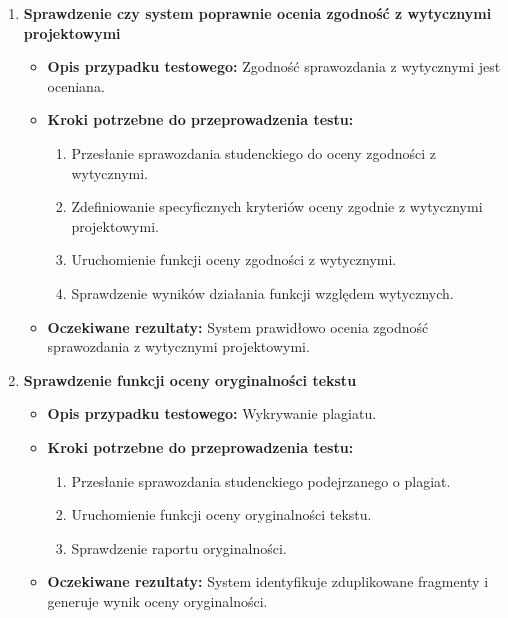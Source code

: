 \documentclass[a4paper, 12pt]{article}
\begin{document}
\begin{enumerate}
\item \textbf{Sprawdzenie czy system poprawnie ocenia zgodność z wytycznymi projektowymi}
   \begin{itemize}
   \item \textbf{Opis przypadku testowego:} Zgodność sprawozdania z wytycznymi jest oceniana.
   \item \textbf{Kroki potrzebne do przeprowadzenia testu:}
     \begin{enumerate}
     \item Przesłanie sprawozdania studenckiego do oceny zgodności z wytycznymi.
     \item Zdefiniowanie specyficznych kryteriów oceny zgodnie z wytycznymi projektowymi.
     \item Uruchomienie funkcji oceny zgodności z wytycznymi.
     \item Sprawdzenie wyników działania funkcji względem wytycznych.
     \end{enumerate}
   \item \textbf{Oczekiwane rezultaty:} System prawidłowo ocenia zgodność sprawozdania z wytycznymi projektowymi.
   \end{itemize}

\item \textbf{Sprawdzenie funkcji oceny oryginalności tekstu}
   \begin{itemize}
   \item \textbf{Opis przypadku testowego:} Wykrywanie plagiatu.
   \item \textbf{Kroki potrzebne do przeprowadzenia testu:}
     \begin{enumerate}
     \item Przesłanie sprawozdania studenckiego podejrzanego o plagiat.
     \item Uruchomienie funkcji oceny oryginalności tekstu.
     \item Sprawdzenie raportu oryginalności.
     \end{enumerate}
   \item \textbf{Oczekiwane rezultaty:} System identyfikuje zduplikowane fragmenty i generuje wynik oceny oryginalności.
   \end{itemize}


\end{enumerate}
\end{document}
